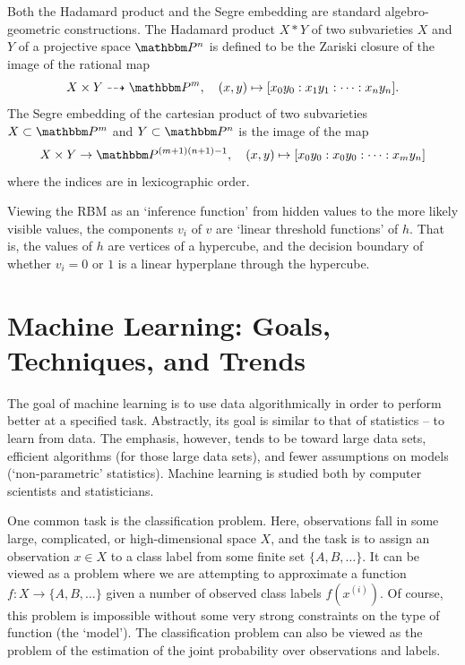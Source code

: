 \documentclass[11pt,titlepage]{article}
\begin{document}
    Both the Hadamard product and the Segre embedding are standard
    algebro-geometric constructions.  The Hadamard product $X * Y$ of two
    subvarieties $X$ and $Y$ of a projective space $\Proj^n$ is defined to be
    the Zariski closure of the image of the rational map
    \[
        X \times Y \dashrightarrow \Proj^m,
        \quad
        (x, y) \mapsto [x_0y_0: x_1y_1 : \cdots : x_n y_n].
    \]
    The Segre embedding of the cartesian product of two subvarieties $X \subset
    \Proj^m$ and $Y \subset \Proj^n$ is the image of the map
    \[
        X \times Y \to \Proj^{(m+1)(n+1) - 1},
        \quad
        (x, y) \mapsto
        [x_0y_0: x_0 y_0 : \cdots : x_my_n]
    \]
    where the indices are in lexicographic order.

    Viewing the RBM as an `inference function' from hidden values to the more
    likely visible values, the components $v_i$ of $v$ are
    `linear threshold functions' of $h$.  That is, the values of $h$ are
    vertices of a hypercube, and the decision boundary of whether $v_i = 0$ or
    $1$ is a linear hyperplane through the hypercube.


\section{Machine Learning: Goals, Techniques, and Trends}

    The goal of machine learning is to use data algorithmically in order to
    perform better at a specified task.  Abstractly, its goal is similar to that
    of statistics -- to learn from data.  The emphasis, however, tends to be
    toward large data sets, efficient algorithms (for those large data sets),
    and fewer assumptions on models (`non-parametric' statistics).  Machine
    learning is studied both by computer scientists and statisticians.

    One common task is the classification problem.  Here, observations fall in
    some large, complicated, or high-dimensional space $X$, and the task is to
    assign an observation $x \in X$ to a class label from some finite set $\{A,
    B, \ldots \}$.  It can be viewed as a problem where we are attempting to
    approximate a function $f : X \to \{A, B, \ldots\}$ given a number of
    observed class labels $f(x^{(i)})$.  Of course, this problem is impossible
    without some very strong constraints on the type of function (the `model').
    The classification problem can also be viewed as the problem of the
    estimation of the joint probability over observations and labels.
\end{document}
